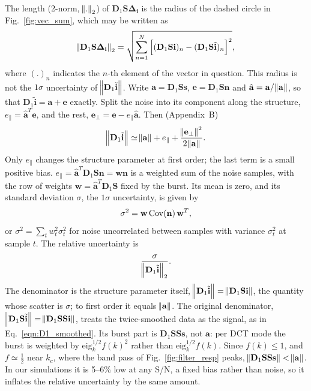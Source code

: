 \documentclass[twocolumn]{aastex631}
\begin{document}
The length (2-norm, $\norm{.}_2$) of $\mathbf{D}_1\mathbf{S}\mathbf{\Delta_i}$ is the radius of the dashed circle in Fig.~\ref{fig:vec_sum}, which may be written as 
\begin{eqnarray}
\norm{\mathbf{D}_1\mathbf{S}\mathbf{\Delta_i}}_2=\sqrt{\sum_{n=1}^N \left[(\mathbf{D}_1\mathbf{S}\mathbf{i})_n-(\mathbf{D}_1\mathbf{S}\tilde{\mathbf{i}})_n\right]^2},
\label{eqn:norm_D1Si}
\end{eqnarray}
where $(.)_n$ indicates the $n$-th element of the vector in question. This radius is not the $1\sigma$ uncertainty of $\norm{\mathbf{D}_1\tilde{\mathbf{i}}}$. Write $\mathbf{a}=\mathbf{D}_1\mathbf{S}\mathbf{s}$, $\mathbf{e}=\mathbf{D}_1\mathbf{S}\mathbf{n}$ and $\hat{\mathbf{a}}=\mathbf{a}/\norm{\mathbf{a}}$, so that $\mathbf{D}_1\tilde{\mathbf{i}}=\mathbf{a}+\mathbf{e}$ exactly. Split the noise into its component along the structure, $e_\parallel=\hat{\mathbf{a}}^T\mathbf{e}$, and the rest, $\mathbf{e}_\perp=\mathbf{e}-e_\parallel\hat{\mathbf{a}}$. Then (Appendix~B)
\begin{eqnarray}
\norm{\mathbf{D}_1\tilde{\mathbf{i}}}\simeq\norm{\mathbf{a}}+e_\parallel+\frac{\norm{\mathbf{e}_\perp}^2}{2\norm{\mathbf{a}}}.
\label{eqn:expand}
\end{eqnarray}
Only $e_\parallel$ changes the structure parameter at first order; the last term is a small positive bias. $e_\parallel=\hat{\mathbf{a}}^T\mathbf{D}_1\mathbf{S}\mathbf{n}=\mathbf{w}\mathbf{n}$ is a weighted sum of the noise samples, with the row of weights $\mathbf{w}=\hat{\mathbf{a}}^T\mathbf{D}_1\mathbf{S}$ fixed by the burst. Its mean is zero, and its standard deviation $\sigma$, the $1\sigma$ uncertainty, is given by
\begin{eqnarray}
\sigma^2=\mathbf{w}\,{\rm Cov}(\mathbf{n})\,\mathbf{w}^T,
\label{eqn:sigma}
\end{eqnarray}
or $\sigma^2=\sum_tw_t^2\sigma_t^2$ for noise uncorrelated between samples with variance $\sigma_t^2$ at sample $t$. The relative uncertainty is
\begin{eqnarray}
\frac{\sigma}{\norm{\mathbf{D}_1\tilde{\mathbf{i}}}_2}.
\label{eqn:rel_error}
\end{eqnarray}
The denominator is the structure parameter itself, $\norm{\mathbf{D}_1\tilde{\mathbf{i}}}=\norm{\mathbf{D}_1\mathbf{S}\mathbf{i}}$, the quantity whose scatter is $\sigma$; to first order it equals $\norm{\mathbf{a}}$. The original denominator, $\norm{\mathbf{D}_1\mathbf{S}\tilde{\mathbf{i}}}=\norm{\mathbf{D}_1\mathbf{S}\mathbf{S}\mathbf{i}}$, treats the twice-smoothed data as the signal, as in Eq.~\eqref{eqn:D1_smoothed}. Its burst part is $\mathbf{D}_1\mathbf{S}\mathbf{S}\mathbf{s}$, not $\mathbf{a}$: per DCT mode the burst is weighted by $\text{eig}_k^{1/2}f(k)^2$ rather than $\text{eig}_k^{1/2}f(k)$. Since $f(k)\le1$, and $f\simeq\tfrac12$ near $k_c$, where the band pass of Fig.~\ref{fig:filter_resp} peaks, $\norm{\mathbf{D}_1\mathbf{S}\mathbf{S}\mathbf{s}}<\norm{\mathbf{a}}$. In our simulations it is 5--6\% low at any S/N, a fixed bias rather than noise, so it inflates the relative uncertainty by the same amount.
\end{document}
